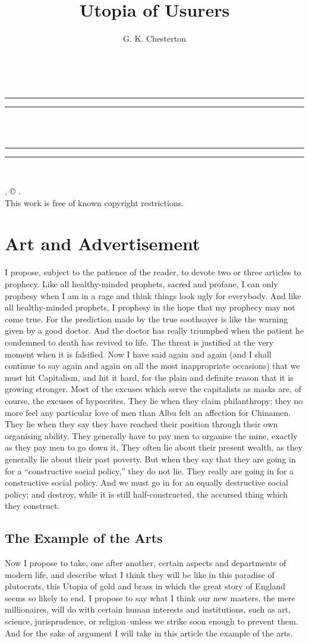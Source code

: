 \documentclass{book}
\date{}
\title{Utopia of Usurers}
\author{G. K. Chesterton}
\makeatletter
\renewcommand{\maketitle}{
  \thispagestyle{empty}
  \vspace*{\stretch{1}}
  
  \begin{center}
    {\Huge \@title   \\[5mm]}
  \end{center}
  \vspace*{\stretch{2}}
  
  \newpage
  \thispagestyle{empty}
  \cleardoublepage

  \begin{center}  
    \thispagestyle{empty}
    \vspace*{\baselineskip}
    \rule{\textwidth}{1.6pt}\vspace*{-\baselineskip}\vspace*{2pt}
    \rule{\textwidth}{0.4pt}\\[\baselineskip]
    
    {\Huge\scshape \@title   \\[5mm]}
    {\Large }
    
    \rule{\textwidth}{0.4pt}\vspace*{-\baselineskip}\vspace{3.2pt}
    \rule{\textwidth}{1.6pt}\\[\baselineskip]

    \vspace*{4\baselineskip}

    {\Large \@author}
    \vfill
    
  \end{center}
  
  \pagebreak
  \newpage
  \thispagestyle{empty}
  \null\vfill
  \noindent
  \begin{center}
    {\emph{\@title}, © \@author.\\[5mm]}
    {This work is free of known copyright restrictions.\\[5mm]}
  \end{center}
  \pagebreak
  \newpage
}
\makeatother
\begin{document}



\maketitle

\setcounter{tocdepth}{0}
\setcounter{secnumdepth}{0}
\tableofcontents
\chapter{Art and Advertisement}
\label{chapter-0}
I propose, subject to the patience of the reader, to devote two or three articles to prophecy. Like all healthy-minded prophets, sacred and profane, I can only prophesy when I am in a rage and think things look ugly for everybody. And like all healthy-minded prophets, I prophesy in the hope that my prophecy may not come true. For the prediction made by the true soothsayer is like the warning given by a good doctor. And the doctor has really triumphed when the patient he condemned to death has revived to life. The threat is justified at the very moment when it is falsified. Now I have said again and again (and I shall continue to say again and again on all the most inappropriate occasions) that we must hit Capitalism, and hit it hard, for the plain and definite reason that it is growing stronger. Most of the excuses which serve the capitalists as masks are, of course, the excuses of hypocrites. They lie when they claim philanthropy; they no more feel any particular love of men than Albu felt an affection for Chinamen. They lie when they say they have reached their position through their own organising ability. They generally have to pay men to organise the mine, exactly as they pay men to go down it. They often lie about their present wealth, as they generally lie about their past poverty. But when they say that they are going in for a “constructive social policy,” they do not lie. They really are going in for a constructive social policy. And we must go in for an equally destructive social policy; and destroy, while it is still half-constructed, the accursed thing which they construct.

\section{The Example of the Arts}
Now I propose to take, one after another, certain aspects and departments of modern life, and describe what I think they will be like in this paradise of plutocrats, this Utopia of gold and brass in which the great story of England seems so likely to end. I propose to say what I think our new masters, the mere millionaires, will do with certain human interests and institutions, such as art, science, jurisprudence, or religion–unless we strike soon enough to prevent them. And for the sake of argument I will take in this article the example of the arts.
\end{document}
